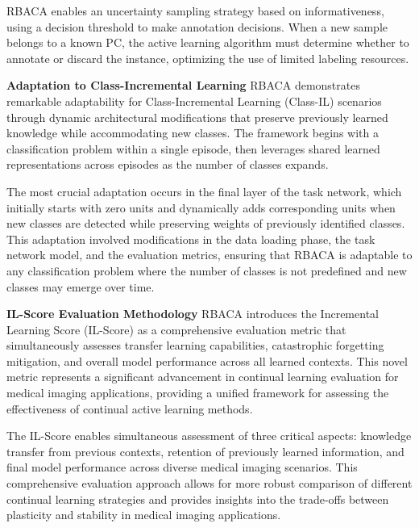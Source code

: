 \documentclass{IEEEcsmag}
\begin{document}
    RBACA enables an uncertainty sampling strategy based on informativeness, using a decision threshold to make annotation decisions.
    When a new sample belongs to a known PC, the active learning algorithm must determine whether to annotate or discard the instance, optimizing the use of limited labeling resources\cite{cite-19}.
    
    \textbf{Adaptation to Class-Incremental Learning}\newline
    RBACA demonstrates remarkable adaptability for Class-Incremental Learning (Class-IL) scenarios through dynamic architectural modifications that preserve previously learned knowledge while accommodating new classes\cite{cite-19}.
    The framework begins with a classification problem within a single episode, then leverages shared learned representations across episodes as the number of classes expands.
    
    The most crucial adaptation occurs in the final layer of the task network, which initially starts with zero units and dynamically adds corresponding units when new classes are detected while preserving weights of previously identified classes\cite{cite-19}.
    This adaptation involved modifications in the data loading phase, the task network model, and the evaluation metrics, ensuring that RBACA is adaptable to any classification problem where the number of classes is not predefined and new classes may emerge over time.
    
    \textbf{IL-Score Evaluation Methodology}\newline
    RBACA introduces the Incremental Learning Score (IL-Score) as a comprehensive evaluation metric that simultaneously assesses transfer learning capabilities, catastrophic forgetting mitigation, and overall model performance across all learned contexts\cite{cite-19}.
    This novel metric represents a significant advancement in continual learning evaluation for medical imaging applications, providing a unified framework for assessing the effectiveness of continual active learning methods.
    
    The IL-Score enables simultaneous assessment of three critical aspects: knowledge transfer from previous contexts, retention of previously learned information, and final model performance across diverse medical imaging scenarios\cite{cite-19}.
    This comprehensive evaluation approach allows for more robust comparison of different continual learning strategies and provides insights into the trade-offs between plasticity and stability in medical imaging applications.
    
\end{document}
